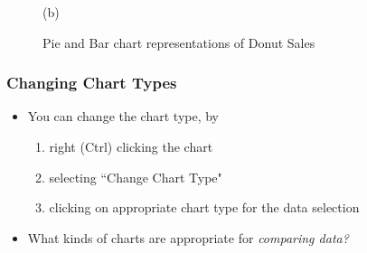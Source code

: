 \documentclass[12pt]{beamer}
\begin{document}
\begin{frame}
\begin{itemize}
\begin{figure}[htb]
\begin{minipage}[t]{0.5\linewidth}
				\medskip
				\centerline{(b)}
			\end{minipage}
			\caption{Pie and Bar chart representations of Donut Sales}
		\end{figure}
		\end{itemize}
	 
	\end{frame}

	\begin{frame}
		\frametitle{Changing Chart Types}
		\begin{itemize}
			\item You can change the chart type, by
			\begin{enumerate}
				\item right (Ctrl) clicking the chart 
				\item selecting ``Change Chart Type"
				\item clicking on appropriate chart type for the data selection
			\end{enumerate}
		\item What kinds of charts are appropriate for \textit{comparing data?}
		\end{itemize}
	\end{frame}
\end{document}
